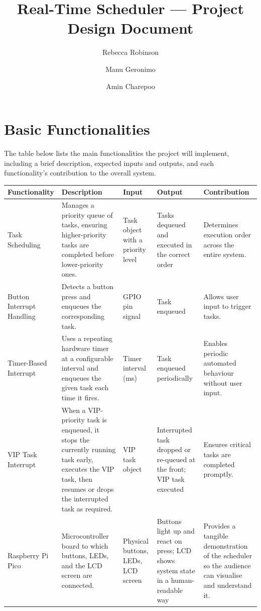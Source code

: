 \documentclass[12pt]{article}
\title{\textbf{Real-Time Scheduler --- Project Design Document}}
\author{Rebecca Robinson \and Manu Geronimo \and Amin Charepoo}
\date{}
\begin{document}
\maketitle

\section*{Basic Functionalities}

The table below lists the main functionalities the project will implement,
including a brief description, expected inputs and outputs, and each
functionality's contribution to the overall system.

\begin{longtable}{P{2.8cm} P{3.2cm} P{2.2cm} P{2.8cm} P{3cm}}
\toprule
\textbf{Functionality} & \textbf{Description} & \textbf{Input} & \textbf{Output} & \textbf{Contribution} \\
\midrule
\endhead

Task Scheduling
& Manages a priority queue of tasks, ensuring higher-priority tasks are
  completed before lower-priority ones.
& Task object with a priority level
& Tasks dequeued and executed in the correct order
& Determines execution order across the entire system. \\
\midrule

Button Interrupt Handling
& Detects a button press and enqueues the corresponding task.
& GPIO pin signal
& Task enqueued
& Allows user input to trigger tasks. \\
\midrule

Timer-Based Interrupt
& Uses a repeating hardware timer at a configurable interval and enqueues
  the given task each time it fires.
& Timer interval (ms)
& Task enqueued periodically
& Enables periodic automated behaviour without user input. \\
\midrule

VIP Task Interrupt
& When a VIP-priority task is enqueued, it stops the currently running
  task early, executes the VIP task, then resumes or drops the
  interrupted task as required.
& VIP task object
& Interrupted task dropped or re-queued at the front; VIP task executed
& Ensures critical tasks are completed promptly. \\
\midrule

Raspberry Pi Pico
& Microcontroller board to which buttons, LEDs, and the LCD screen are
  connected.
& Physical buttons, LEDs, LCD screen
& Buttons light up and react on press; LCD shows system state in a
  human-readable way
& Provides a tangible demonstration of the scheduler so the audience can
  visualise and understand it. \\
\midrule


\end{longtable}
\end{document}
